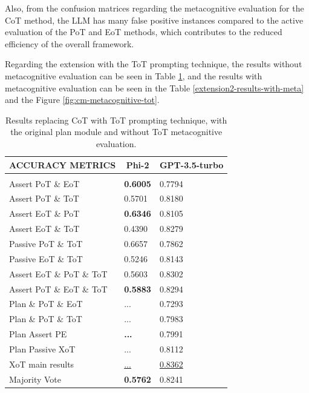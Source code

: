 \documentclass[10pt]{article} %
\begin{document}
Also, from the confusion matrices regarding the metacognitive evaluation for the CoT method, the LLM has many false positive instances compared to the active evaluation of the PoT and EoT methods, which contributes to the reduced efficiency of the overall framework.

Regarding the extension with the ToT prompting technique, the results without metacognitive evaluation can be seen in Table \ref{extension2-results-without-meta}, and the results with metacognitive evaluation can be seen in the Table \ref{extension2-results-with-meta} and the Figure \ref{fig:cm-metacognitive-tot}.

\begin{table}[t]
  \caption{Results replacing CoT with ToT prompting technique, with the original plan module and without ToT metacognitive evaluation.}
  \label{extension2-results-without-meta}
  \begin{center}
  \begin{tabular}{lll}
  \multicolumn{1}{c}{\bf ACCURACY METRICS}  &\multicolumn{1}{c}{\bf Phi-2}  &\multicolumn{1}{c}{\bf GPT-3.5-turbo}
  \\ \hline \\
  Assert PoT \& EoT                         &\textbf{0.6005}                &0.7794\\
  Assert PoT \& ToT                         &0.5701                         &0.8180\\
  Assert EoT \& PoT                         &\textbf{0.6346}                &0.8105\\
  Assert EoT \& ToT                         &0.4390                         &0.8279\\
  Passive PoT \& ToT                        &0.6657                         &0.7862\\
  Passive EoT \& ToT                        &0.5246                         &0.8143\\
  Assert EoT \& PoT \& ToT                  &0.5603                         &0.8302\\
  Assert PoT \& EoT \& ToT                  &\textbf{0.5883}                &0.8294\\
  Plan \& PoT \& EoT                        &...                         &0.7293\\
  Plan \& PoT \& ToT                        &...                         &0.7983\\
  Plan Assert PE                            &\textbf{...}                &0.7991\\
  Plan Passive XoT                          &...                         &0.8112\\
  XoT main results                          &\underline{...}             &\underline{0.8362}\\
  Majority Vote                             &\textbf{0.5762}                &0.8241\\
  \end{tabular}
  \end{center}
  \end{table}
\end{document}
